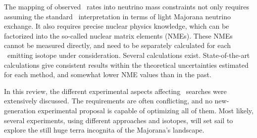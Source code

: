 The mapping of observed \bbonu\ rates into neutrino mass constraints not only requires assuming the standard \bbonu\ interpretation in terms of light Majorana neutrino exchange. It also requires precise nuclear physics knowledge, which can be factorized into the so-called nuclear matrix elements (NMEs). These NMEs cannot be measured directly, and need to be separately calculated for each \bb\ emitting isotope under consideration. Several calculations exist. State-of-the-art calculations give consistent results within the theoretical uncertainties estimated for each method, and somewhat lower NME values than in the past. 

In this review, the different experimental aspects affecting \bbonu\ searches were extensively discussed. The requirements are often conflicting, and no new-generation experimental proposal is capable of optimizing all of them. Most likely, several experiments, using different approaches and isotopes, will set sail to explore the still huge terra incognita of the Majorana's landscape. 





  

